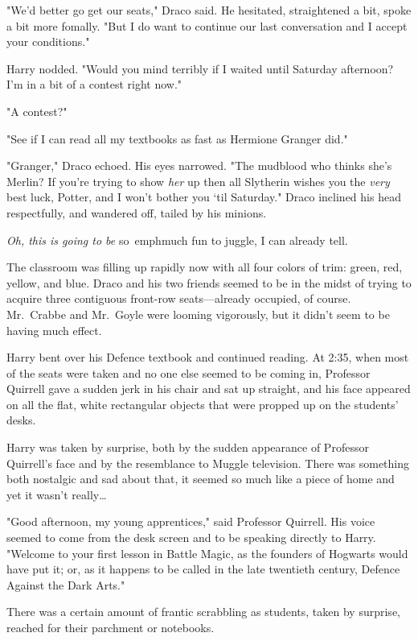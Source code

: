 "We'd better go get our seats," Draco said. He hesitated, straightened a bit, 
spoke a bit more fomally. "But I do want to continue our last conversation and 
I accept your conditions."

Harry nodded. "Would you mind terribly if I waited until Saturday afternoon? 
I'm in a bit of a contest right now."

"A contest?"

"See if I can read all my textbooks as fast as Hermione Granger did."

"Granger," Draco echoed. His eyes narrowed. "The mudblood who thinks she's 
Merlin? If you're trying to show \emph{her} up then all Slytherin wishes you 
the \emph{very} best luck, Potter, and I won't bother you `til Saturday." Draco 
inclined his head respectfully, and wandered off, tailed by his minions.

\emph{Oh, this is going to be} so\ emph{much fun to juggle, I can already tell.}

The classroom was filling up rapidly now with all four colors of trim: green, 
red, yellow, and blue. Draco and his two friends seemed to be in the midst of 
trying to acquire three contiguous front-row seats---already occupied, of 
course. Mr.~Crabbe and Mr.~Goyle were looming vigorously, but it didn't seem to 
be having much effect.

Harry bent over his Defence textbook and continued reading.
\sbreak
At 2:35\PM, when most of the seats were taken and no one else seemed to be 
coming in, Professor Quirrell gave a sudden jerk in his chair and sat up 
straight, and his face appeared on all the flat, white rectangular objects that 
were propped up on the students' desks.

Harry was taken by surprise, both by the sudden appearance of Professor 
Quirrell's face and by the resemblance to Muggle television. There was 
something both nostalgic and sad about that, it seemed so much like a piece of 
home and yet it wasn't really{\ldots}

"Good afternoon, my young apprentices," said Professor Quirrell. His voice 
seemed to come from the desk screen and to be speaking directly to Harry. 
"Welcome to your first lesson in Battle Magic, as the founders of Hogwarts 
would have put it; or, as it happens to be called in the late twentieth 
century, Defence Against the Dark Arts."

There was a certain amount of frantic scrabbling as students, taken by 
surprise, reached for their parchment or notebooks.

